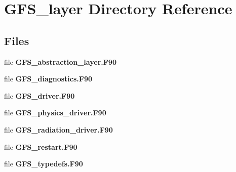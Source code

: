 \section{G\+F\+S\+\_\+layer Directory Reference}
\label{dir_2961c5a6060afe1eafbb56d6f69a970f}
\subsection*{Files}
\begin{DoxyCompactItemize}
\item 
file \textbf{ G\+F\+S\+\_\+abstraction\+\_\+layer.\+F90}
\item 
file \textbf{ G\+F\+S\+\_\+diagnostics.\+F90}
\item 
file \textbf{ G\+F\+S\+\_\+driver.\+F90}
\item 
file \textbf{ G\+F\+S\+\_\+physics\+\_\+driver.\+F90}
\item 
file \textbf{ G\+F\+S\+\_\+radiation\+\_\+driver.\+F90}
\item 
file \textbf{ G\+F\+S\+\_\+restart.\+F90}
\item 
file \textbf{ G\+F\+S\+\_\+typedefs.\+F90}
\end{DoxyCompactItemize}
